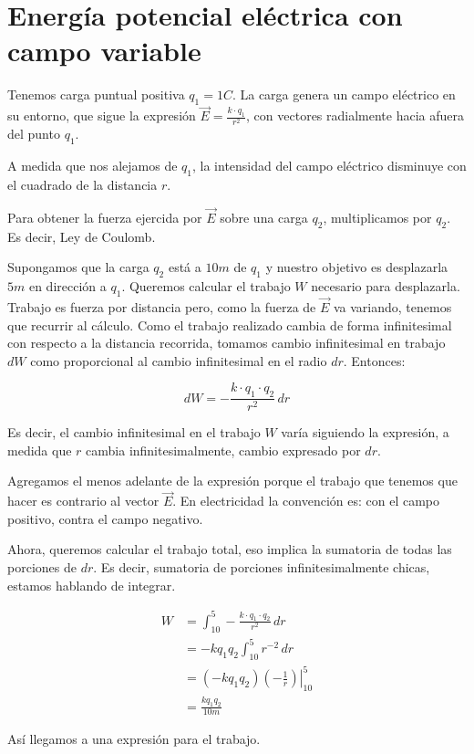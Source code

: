 \section{Energía potencial eléctrica con campo variable}

Tenemos carga puntual positiva \(q_1=1C\).
La carga genera un campo eléctrico en su entorno,
que sigue la expresión \(\vec{E}=\frac{k\cdot q_1}{r^{2}}\),
con vectores radialmente hacia afuera del punto \(q_1\).

A medida que nos alejamos de \(q_1\),
la intensidad del campo eléctrico disminuye con el cuadrado de la distancia \(r\).

Para obtener la fuerza ejercida por \(\vec{E}\)
sobre una carga \(q_2\),
multiplicamos por \(q_2\).
Es decir, Ley de Coulomb.

Supongamos que la carga \(q_2\) está a \(10m\) de \(q_1\)
y nuestro objetivo es desplazarla \(5m\) en dirección a \(q_1\).
Queremos calcular el trabajo \(W\)
necesario para desplazarla.
Trabajo es fuerza por distancia pero,
como la fuerza de \(\vec{E}\) va variando,
tenemos que recurrir al cálculo.
Como el trabajo realizado cambia de forma infinitesimal con respecto a la distancia recorrida,
tomamos cambio infinitesimal en trabajo \(dW\) como proporcional
al cambio infinitesimal en el radio \(dr\).
Entonces:

\vspace{.5cm}
\begin{equation*}
    dW = -\frac{k\cdot q_1\cdot q_2}{r^{2}}\,dr
\end{equation*}
\vspace{.5cm}

Es decir,
el cambio infinitesimal en el trabajo \(W\) varía siguiendo la expresión,
a medida que \(r\) cambia infinitesimalmente, 
cambio expresado por \(dr\).

Agregamos el menos adelante de la expresión porque el trabajo que tenemos 
que hacer es contrario al vector \(\vec{E}\).
En electricidad la convención es:
con el campo positivo, contra el campo negativo.

Ahora,
queremos calcular el trabajo total,
eso implica la sumatoria de todas las porciones de \(dr\).
Es decir,
sumatoria de porciones infinitesimalmente chicas, 
estamos hablando de integrar.

\begin{align*}
    W & = \int_{10}^{5}-\frac{k\cdot q_1\cdot q_2}{r^{2}}\,dr \\
    & = -kq_1q_2 \int_{10}^{5} r^{-2}\,dr \\
    & = (-kq_1q_2) \left.(-\frac{1}{r})\right|_{10}^{5} \\
    & = \boxed{\frac{kq_1q_2}{10m}}
\end{align*}

Así llegamos a una expresión para el trabajo.